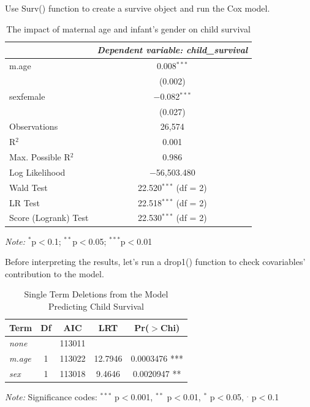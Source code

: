 \documentclass[12pt,letterpaper]{article}
\begin{document}
\noindent Use Surv() function to create a survive object and run  the Cox model.

\begin{table}[!htbp]
	\centering
	\caption{The impact of maternal age and infant's gender on child survival}
	\label{tab:child_surv_analysis}
	\begin{tabular}{@{}lc@{}}
		\toprule
		& \textit{Dependent variable: child\_survival} \\ 
		\midrule
		m.age & 0.008$^{***}$ \\
		& (0.002) \\
		
		sexfemale & $-$0.082$^{***}$ \\
		& (0.027) \\
		\midrule
		Observations & 26,574 \\
		R$^{2}$ & 0.001 \\
		Max. Possible R$^{2}$ & 0.986 \\
		Log Likelihood & $-$56,503.480 \\
		Wald Test & 22.520$^{***}$ (df = 2) \\
		LR Test & 22.518$^{***}$ (df = 2) \\
		Score (Logrank) Test & 22.530$^{***}$ (df = 2) \\
		\bottomrule
	\end{tabular}
	\smallskip
	
	\textit{Note:} $^{*}$p$<$0.1; $^{**}$p$<$0.05; $^{***}$p$<$0.01
\end{table} 

\noindent Before interpreting the results, let's run a drop1() function to check covariables' contribution to the model.


\begin{table}[!htbp]
	\centering
	\caption{Single Term Deletions from the Model Predicting Child Survival}
	\label{tab:single_term_deletions}
	\begin{tabular}{lcccc}
		\toprule
		Term & Df & AIC & LRT & Pr($>$Chi) \\
		\midrule
		\textit{none} & & 113011 & & \\
		\textit{m.age} & 1 & 113022 & 12.7946 & 0.0003476 *** \\
		\textit{sex} & 1 & 113018 & 9.4646 & 0.0020947 ** \\
		\bottomrule
	\end{tabular}
	
		\smallskip
	\textit{Note:} Significance codes: $^{***}$ p$<$0.001, $^{**}$ p$<$0.01, $^{*}$ p$<$0.05, $^{.}$ p$<$0.1
\end{table}
\end{document}
